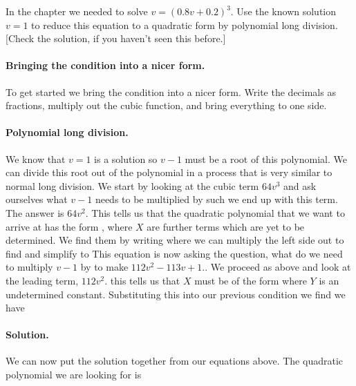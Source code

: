\label{exAttackPolyLong}In the chapter we needed to solve $v=(0.8v+0.2)^3$. Use the known solution $v=1$ to reduce this equation to a quadratic form by polynomial long division. [Check the solution, if you haven't seen this before.]

\solution
\paragraph{Bringing the condition into a nicer form.}To get started we bring the condition into a nicer form. Write the decimals as fractions, multiply out the cubic function, and bring everything to one side. 
\paragraph{Polynomial long division.}We know that $v=1$ is a solution so $v-1$ must be a root of this polynomial. We can divide this root out of the polynomial in a process that is very similar to normal long division. We start by looking at the cubic term $64v^3$ and ask ourselves what $v-1$ needs to be multiplied by such we end up with this term. The answer is $64v^2$. This tells us that the quadratic polynomial that we want to arrive at has the form 
, where $X$ are further terms which are yet to be determined. We find them by writing 
where we can multiply the left side out to find
and simplify to 
This equation is now asking the question, what do we need to multiply $v-1$ by to make $112v^2-113v+1.$. We proceed as above and look at the leading term, $112v^2$. this tells us that $X$ must be of the form 
where $Y$ is an undetermined constant. Substituting this into our previous condition we find we have
\paragraph{Solution.}We can now put the solution together from our equations above. The quadratic polynomial we are looking for is  
